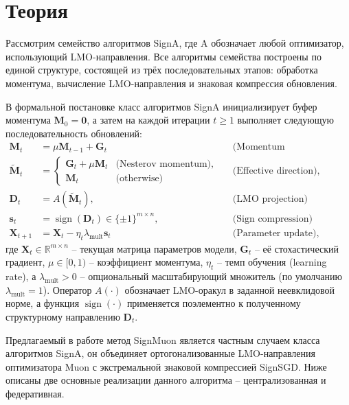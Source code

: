 \documentclass{article}
\begin{document}
\section{Теория}\label{sec:theory}
Рассмотрим семейство алгоритмов SignA, где A обозначает любой оптимизатор, использующий LMO-направления. Все алгоритмы семейства построены по единой структуре, состоящей из трёх последовательных этапов: обработка моментума, вычисление LMO-направления и знаковая компрессия обновления. 

В формальной постановке класс алгоритмов SignA инициализирует буфер моментума $\mathbf{M}_0 = \mathbf{0}$, а затем на каждой итерации $t \ge 1$ выполняет следующую последовательность обновлений:
\begin{equation}
\begin{aligned}
\mathbf{M}_t &= \mu \mathbf{M}_{t-1} + \mathbf{G}_t && \text{(Momentum accumulation)}\\
\tilde{\mathbf{M}}_t &= 
\begin{cases} 
    \mathbf{G}_t + \mu \mathbf{M}_t & \text{(Nesterov momentum)}, \\
    \mathbf{M}_t & \text{(otherwise)}
\end{cases} && \text{(Effective direction)}, \\
\mathbf{D}_t &= A(\tilde{\mathbf{M}}_t), && \text{(LMO projection)} \\
\mathbf{s}_t &= \operatorname{sign}(\mathbf{D}_t) \in \{\pm 1\}^{m \times n},  && \text{(Sign compression)}\\
\mathbf{X}_{t+1} &= \mathbf{X}_t - \eta_t \lambda_{\mathrm{mult}} \mathbf{s}_t && \text{(Parameter update)},
\end{aligned}
\label{eq:signa_general}
\end{equation}
 где $\mathbf{X}_t \in \mathbb{R}^{m \times n}$ -- текущая матрица параметров модели, $\mathbf{G}_t$ -- её стохастический градиент, $\mu \in [0, 1)$ -- коэффициент моментума, $\eta_t$ -- темп обучения (learning rate), а $\lambda_{\mathrm{mult}} > 0$ -- опциональный масштабирующий множитель (по умолчанию $\lambda_{\mathrm{mult}}=1$). Оператор $A(\cdot)$ обозначает LMO-оракул в заданной неевклидовой норме, а функция $\operatorname{sign}(\cdot)$ применяется поэлементно к полученному структурному направлению $\mathbf{D}_t$.

Предлагаемый в работе метод SignMuon является частным случаем класса алгоритмов SignA, он объединяет ортогонализованные LMO-направления оптимизатора Muon с экстремальной знаковой компрессией SignSGD. Ниже описаны две основные реализации данного алгоритма -- централизованная и федеративная.
\end{document}
